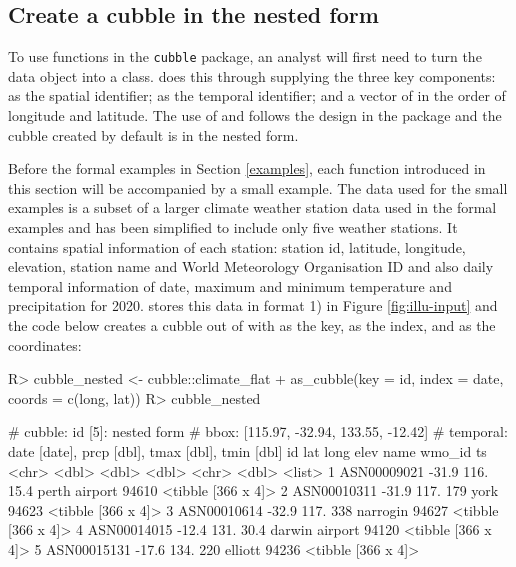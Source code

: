 \documentclass[
]{jss}
\begin{document}
\hypertarget{create-a-cubble-in-the-nested-form}{%
\subsection{Create a cubble in the nested
form}\label{create-a-cubble-in-the-nested-form}}

To use functions in the \texttt{cubble} package, an analyst will first
need to turn the data object into a  class.
 does this through supplying the three key components:
 as the spatial identifier;  as the temporal
identifier; and a vector of  in the order of longitude and
latitude. The use of  and  follows the design in
the  package and the cubble created by default is in the
nested form.

Before the formal examples in Section \ref{examples}, each function
introduced in this section will be accompanied by a small example. The
data used for the small examples is a subset of a larger climate weather
station data used in the formal examples and has been simplified to
include only five weather stations. It contains spatial information of
each station: station id, latitude, longitude, elevation, station name
and World Meteorology Organisation ID and also daily temporal
information of date, maximum and minimum temperature and precipitation
for 2020.  stores this data in format 1) in Figure
\ref{fig:illu-input} and the code below creates a cubble out of
 with  as the key,  as the index,
and  as the coordinates:

\begin{CodeChunk}
\begin{CodeInput}
R> cubble_nested <- cubble::climate_flat %
+   as_cubble(key = id, index = date, coords = c(long, lat))
R> cubble_nested
\end{CodeInput}
\begin{CodeOutput}
# cubble:   id [5]: nested form
# bbox:     [115.97, -32.94, 133.55, -12.42]
# temporal: date [date], prcp [dbl], tmax [dbl], tmin [dbl]
  id            lat  long  elev name           wmo_id ts                
  <chr>       <dbl> <dbl> <dbl> <chr>           <dbl> <list>            
1 ASN00009021 -31.9  116.  15.4 perth airport   94610 <tibble [366 x 4]>
2 ASN00010311 -31.9  117. 179   york            94623 <tibble [366 x 4]>
3 ASN00010614 -32.9  117. 338   narrogin        94627 <tibble [366 x 4]>
4 ASN00014015 -12.4  131.  30.4 darwin airport  94120 <tibble [366 x 4]>
5 ASN00015131 -17.6  134. 220   elliott         94236 <tibble [366 x 4]>
\end{CodeOutput}
\end{CodeChunk}
\end{document}
